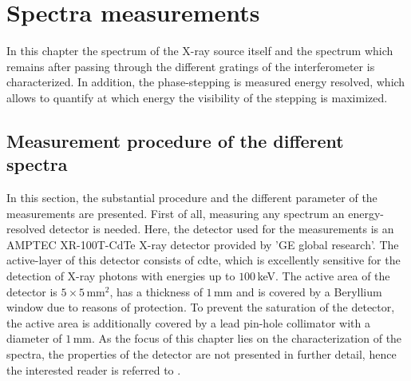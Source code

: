 \chapter{Spectra measurements}\label{chap:spectra}
In this chapter the spectrum of the X-ray source itself and the spectrum which remains after passing through the different gratings of the interferometer is characterized. In addition, the phase-stepping is measured energy resolved, which allows to quantify at which energy the visibility of the stepping is maximized.
\section{Measurement procedure of the different spectra}\label{sec:sourcespectra}
In this section, the substantial procedure and the different parameter of the measurements are presented. First of all, measuring any spectrum an energy-resolved detector is needed. Here, the detector used for the measurements is an AMPTEC XR-100T-CdTe X-ray detector provided by 'GE global research'. The active-layer of this detector consists of \gls{cdte}, which is excellently sensitive for the detection of X-ray photons with energies up to $100\,$keV. The active area of the detector is $5\times5\, \text{mm}^{2}$, has a thickness of $1\,$mm and is covered by a Beryllium window due to reasons of protection. To prevent the saturation of the detector, the active area is additionally covered by a lead pin-hole collimator with a diameter of $1\,$mm. As the focus of this chapter lies on the characterization of the spectra, the properties of the detector are not presented in further detail, hence the interested reader is referred to \cite{amptecdata,Amptec}. \\


